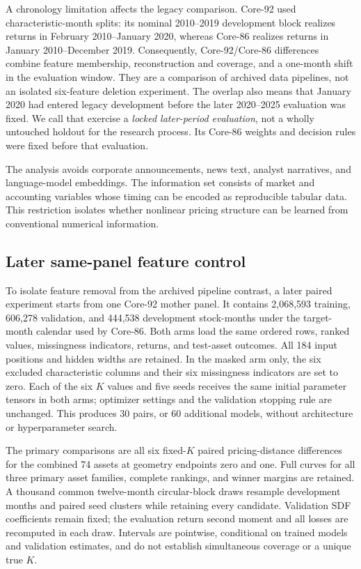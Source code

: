 A chronology limitation affects the legacy comparison. Core-92 used characteristic-month splits: its nominal 2010--2019 development block realizes returns in February 2010--January 2020, whereas Core-86 realizes returns in January 2010--December 2019. Consequently, Core-92/Core-86 differences combine feature membership, reconstruction and coverage, and a one-month shift in the evaluation window. They are a comparison of archived data pipelines, not an isolated six-feature deletion experiment. The overlap also means that January 2020 had entered legacy development before the later 2020--2025 evaluation was fixed. We call that exercise a \emph{locked later-period evaluation}, not a wholly untouched holdout for the research process. Its Core-86 weights and decision rules were fixed before that evaluation.

The analysis avoids corporate announcements, news text, analyst narratives, and language-model embeddings. The information set consists of market and accounting variables whose timing can be encoded as reproducible tabular data. This restriction isolates whether nonlinear pricing structure can be learned from conventional numerical information.

\subsection{Later same-panel feature control}

To isolate feature removal from the archived pipeline contrast, a later paired experiment starts from one Core-92 mother panel. It contains 2,068,593 training, 606,278 validation, and 444,538 development stock-months under the target-month calendar used by Core-86. Both arms load the same ordered rows, ranked values, missingness indicators, returns, and test-asset outcomes. All 184 input positions and hidden widths are retained. In the masked arm only, the six excluded characteristic columns and their six missingness indicators are set to zero. Each of the six $K$ values and five seeds receives the same initial parameter tensors in both arms; optimizer settings and the validation stopping rule are unchanged. This produces 30 pairs, or 60 additional models, without architecture or hyperparameter search.

The primary comparisons are all six fixed-$K$ paired pricing-distance differences for the combined 74 assets at geometry endpoints zero and one. Full curves for all three primary asset families, complete rankings, and winner margins are retained. A thousand common twelve-month circular-block draws resample development months and paired seed clusters while retaining every candidate. Validation SDF coefficients remain fixed; the evaluation return second moment and all losses are recomputed in each draw. Intervals are pointwise, conditional on trained models and validation estimates, and do not establish simultaneous coverage or a unique true $K$.

